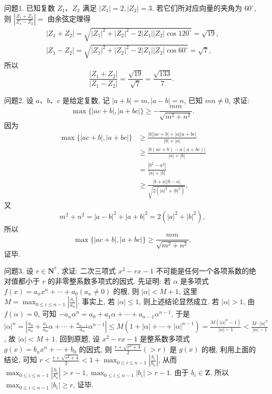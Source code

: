 
问题1. 已知复数 $Z_1 、 Z_2$ 满足 $\left|Z_1\right|=2,\left|Z_2\right|=3$. 若它们所对应向量的夹角为 $60^{\circ}$, 则 $\left|\frac{Z_1+Z_2}{Z_1-Z_2}\right|=$
由余弦定理得
$$
\begin{gathered}
\left|Z_1+Z_2\right|=\sqrt{\left|Z_1\right|^2+\left|Z_2\right|^2-2\left|Z_1\right|\left|Z_2\right| \cos 120^{\circ}}=\sqrt{19}, \\
\left|Z_1-Z_2\right|=\sqrt{\left|Z_1\right|^2+\left|Z_2\right|^2-2\left|Z_1\right|\left|Z_2\right| \cos 60^{\circ}}=\sqrt{7},
\end{gathered}
$$
所以
$$
\frac{\left|Z_1+Z_2\right|}{\left|Z_1-Z_2\right|}=\frac{\sqrt{19}}{\sqrt{7}}=\frac{\sqrt{133}}{7} \text {. }
$$



问题2. 设 $a 、 b 、 c$ 是给定复数, 记 $|a+b|=m,|a-b|=n$, 已知 $m n \neq 0$, 求证:
$$
\max \{|a c+b|,|a+b c|\} \geqslant-\frac{m m}{\sqrt{m^2+n^2}} .
$$
因为
$$
\begin{aligned}
\max \{|a c+b|,|a+b c|\} & \geqslant \frac{|b||a c+b|+|a||a+b c|}{|b|+|a|} \\
& \geqslant \frac{|b(a c+b)-a(a+b c)|}{|a|+|b|} \\
& =\frac{\left|b^2-a^2\right|}{|a|+|b|} \\
& \geqslant \frac{|b+a||b-a|}{\sqrt{2\left(|a|^2+|b|^2\right)}},
\end{aligned}
$$
又
$$
m^2+n^2=|a-b|^2+|a+b|^2=2\left(|a|^2+|b|^2\right),
$$
所以
$$
\max \{|a c+b|,|a+b c|\} \geqslant \frac{m m}{\sqrt{m^2+n^2}},
$$
证毕.



问题3. 设 $r \in \mathbf{N}^*$, 求证: 二次三项式 $x^2-r x-1$ 不可能是任何一个各项系数的绝对值都小于 $r$ 的非零整系数多项式的因式.
先证明: 若 $\alpha$ 是多项式 $f(x)=a_n x^n+\cdots+a_0\left(a_n \neq 0\right)$ 的根, 则 $|\alpha|< M+1$, 这里 $M=\max _{0 \leqslant i \leqslant n-1}\left|\frac{a_i}{a_n}\right|$.
事实上, 若 $|\alpha| \leqslant 1$, 则上述结论显然成立.
若 $|\alpha|>1$, 由 $f(\alpha)=0$, 可知 $-a_n \alpha^n=a_0+a_1 \alpha+\cdots+a_{n-1} \alpha^{n-1}$, 于是 $|\alpha|^n=\left|\frac{a_0}{a_n}+\frac{a_1}{a_n} \alpha+\cdots+\frac{a_{n-1}}{a_n} \alpha^{n-1}\right| \leqslant M\left(1+|\alpha|+\cdots+|\alpha|^{n-1}\right)=\frac{M\left(|\alpha|^n-1\right)}{|\alpha|-1}<\frac{M \cdot|\alpha|^n}{|\alpha|-1}$, 故 $|\alpha|<M+1$.
回到原题, 设 $x^2-r x-1$ 是整系数多项式 $g(x)=b_n x^n+\cdots+b_0$ 的因式, 则 $\frac{r+\sqrt{r^2+4}}{2}(>r)$ 是 $g(x)$ 的根, 利用上面的结论, 可知 $r<\frac{r+\sqrt{r^2+4}}{2} <1+\max _{0 \leqslant i \leqslant n-1}\left|\frac{b_i}{b_n}\right|$, 从而 $\max _{0 \leqslant i \leqslant n-1}\left|\frac{b_i}{b_n}\right|>r-1, \max _{0 \leqslant i \leqslant n-1}\left|b_i\right|>r-1$. 由于 $b_i \in \mathbf{Z}$, 所以 $\max _{0 \leqslant i \leqslant n-1}\left|b_i\right| \geqslant r$, 证毕.



